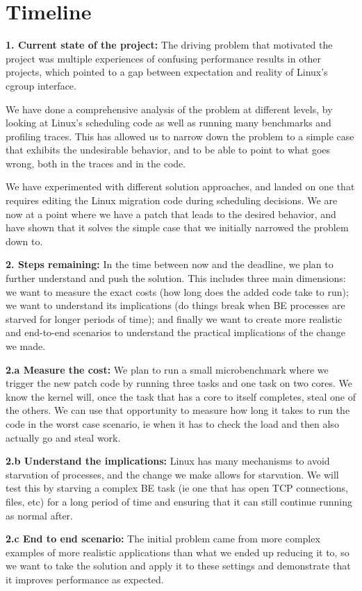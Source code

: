 
\section{Timeline}
\label{sec:timeline}

\textbf{1. Current state of the project:} 
The driving problem that motivated the project was multiple experiences of
confusing performance results in other projects, which pointed to a gap between
expectation and reality of Linux's cgroup interface. 

We have done a comprehensive analysis of the problem at different levels, by
looking at Linux's scheduling code as well as running many benchmarks and
profiling traces. This has allowed us to narrow down the problem to a simple
case that exhibits the undesirable behavior, and to be able to point to what
goes wrong, both in the traces and in the code.

We have experimented with different solution approaches, and landed on one that
requires editing the Linux migration code during scheduling decisions. We are
now at a point where we have a patch that leads to the desired behavior, and
have shown that it solves the simple case that we initially narrowed the problem
down to.

\textbf{2. Steps remaining:} In the time between now and the deadline, we plan
to further understand and push the solution. This includes three main
dimensions: we want to measure the exact costs (how long does the added code
take to run); we want to understand its implications (do things break when BE
processes are starved for longer periods of time); and finally we want to create
more realistic and end-to-end scenarios to understand the practical implications
of the change we made.

\textbf{2.a Measure the cost:} We plan to run a small microbenchmark where we
trigger the new patch code by running three \schednormal{} tasks and one
\schedidle{} task on two cores. We know the kernel will, once the \schednormal{}
task that has a core to itself completes, steal one of the others. We can use
that opportunity to measure how long it takes to run the code in the worst case
scenario, ie when it has to check the load and then also actually go and steal work.

\textbf{2.b Understand the implications:} Linux has many mechanisms to avoid
starvation of processes, and the change we make allows for starvation. We will
test this by starving a complex BE task (ie one that has open TCP connections,
files, etc) for a long period of time and ensuring that it can still continue
running as normal after.

\textbf{2.c End to end scenario:} The initial problem came from more complex
examples of more realistic applications than what we ended up reducing it to, so
we want to take the solution and apply it to these settings and demonstrate that
it improves performance as expected.


